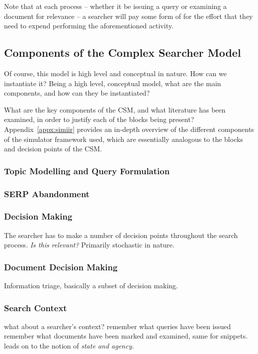 Note that at each process -- whether it be issuing a query or examining a document for relevance -- a searcher will pay some form of  for the effort that they need to expend performing the aforementioned activity. 



\subsection{Components of the Complex Searcher Model}
Of course, this model is high level and conceptual in nature. How can we instantiate it?
Being a high level, conceptual model, what are the main components, and how can they be instantiated?

What are the key components of the CSM, and what literature has been examined, in order to justify each of the blocks being present? Appendix~\ref{appx:simiir} provides an in-depth overview of the different components of the simulator framework used, which are essentially analogous to the blocks and decision points of the CSM.

\subsubsection{Topic Modelling and Query Formulation}

\subsubsection{SERP Abandonment}

\subsubsection{Decision Making}
The searcher has to make a number of decision points throughout the search process.
\emph{Is this relevant?}
Primarily stochastic in nature.

\subsubsection{Document Decision Making}
Information triage, basically a subset of decision making.

\subsubsection{Search Context}
what about a searcher's context?
remember what queries have been issued
remember what documents have been marked and examined, same for snippets.
leads on to the notion of \emph{state and agency.}

